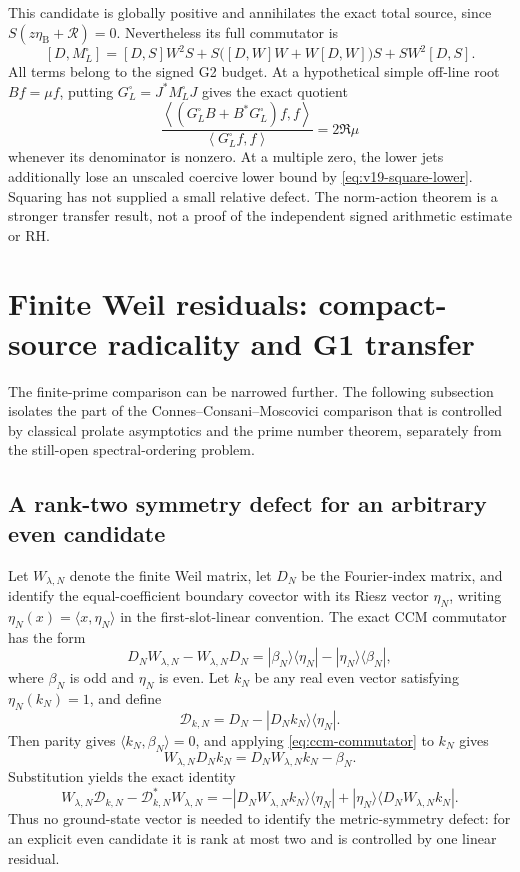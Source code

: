 \documentclass[11pt]{article}
\theoremstyle{remark}
\newcommand{\ip}[2]{\left\langle #1,#2\right\rangle}
\begin{document}
This candidate is globally positive and annihilates the exact total
source, since $S(z\eta_{\mathrm B}+\mathcal R)=0$. Nevertheless
its full commutator is
\[
 [D,M_L^{\square}]=[D,S]W^2S
     +S\bigl([D,W]W+W[D,W]\bigr)S+SW^2[D,S].
\]
All terms belong to the signed G2 budget. At a hypothetical simple
off-line root $Bf=\mu f$, putting $G_L^{\square}=J^*M_L^{\square}J$
gives the exact quotient
\[
 \frac{\ip{(G_L^{\square}B+B^*G_L^{\square})f}{f}}
      {\ip{G_L^{\square}f}{f}}=2\Re\mu
\]
whenever its denominator is nonzero. At a multiple zero, the lower
jets additionally lose an unscaled coercive lower bound by
\eqref{eq:v19-square-lower}. Squaring has not supplied a small
relative defect. The norm-action theorem is a stronger transfer result,
not a proof of the independent signed arithmetic estimate or RH.

\section{Finite Weil residuals: compact-source radicality and G1 transfer}\label{sec:g1}
The finite-prime comparison can be narrowed further.  The following subsection isolates the part of the Connes--Consani--Moscovici comparison that is controlled by classical prolate asymptotics and the prime number theorem, separately from the still-open spectral-ordering problem.

\subsection*{A rank-two symmetry defect for an arbitrary even candidate}
Let $W_{\lambda,N}$ denote the finite Weil matrix, let $D_N$ be the Fourier-index matrix, and identify the equal-coefficient boundary covector with its Riesz vector $\eta_N$, writing $\eta_N(x)=\langle x,\eta_N\rangle$ in the first-slot-linear convention.  The exact CCM commutator has the form
\begin{equation}\label{eq:ccm-commutator}
 D_NW_{\lambda,N}-W_{\lambda,N}D_N
 =|\beta_N\rangle\langle\eta_N|-|\eta_N\rangle\langle\beta_N|,
\end{equation}
where $\beta_N$ is odd and $\eta_N$ is even.  Let $k_N$ be any real even vector satisfying $\eta_N(k_N)=1$, and define
\[
 \mathcal D_{k,N}=D_N-|D_Nk_N\rangle\langle\eta_N|.
\]
Then parity gives $\langle k_N,\beta_N\rangle=0$, and applying \eqref{eq:ccm-commutator} to $k_N$ gives
\[
 W_{\lambda,N}D_Nk_N=D_NW_{\lambda,N}k_N-\beta_N.
\]
Substitution yields the exact identity
\begin{equation}\label{eq:ranktwo-weil-defect}
 \boxed{
 W_{\lambda,N}\mathcal D_{k,N}
 -\mathcal D_{k,N}^{*}W_{\lambda,N}
 =-|D_NW_{\lambda,N}k_N\rangle\langle\eta_N|
  +|\eta_N\rangle\langle D_NW_{\lambda,N}k_N|.}
\end{equation}
Thus no ground-state vector is needed to identify the metric-symmetry defect: for an explicit even candidate it is rank at most two and is controlled by one linear residual.
\end{document}
